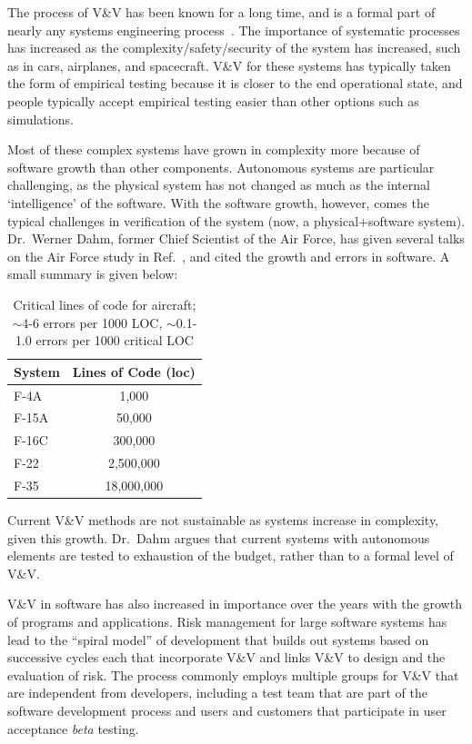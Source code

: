 The process of V\&V has been known for a long time, and is a formal part of nearly any systems engineering process~\cite{Blanchard2010}. The importance  of systematic processes has increased as the complexity/safety/security of the system has increased, such as in cars, airplanes, and spacecraft. V\&V for these systems has typically taken the form of empirical testing because it is closer to the end operational state, and people typically accept empirical testing easier than other options such as simulations. 

Most of these complex systems have grown in complexity more because of software growth than other components. Autonomous systems are particular challenging, as the physical system has not changed as much as the internal `intelligence' of the software. With the software growth, however, comes the typical challenges in verification of the system (now, a physical+software system). Dr.\ Werner Dahm, former Chief Scientist of the Air Force, has given several talks on the Air Force study in Ref.~\cite{tech-horizons2011}, and cited the growth and errors in software. A small summary is given below:

\begin{table}
\begin{center}
\begin{tabular}{l|c}
System &  Lines of Code (loc)\\ \hline
F-4A & 1,000\\
F-15A &  50,000\\
F-16C &  300,000\\
F-22 &  2,500,000\\
F-35 &  18,000,000
\end{tabular}
\caption{Critical lines of code for aircraft; $\sim$4-6 errors per 1000 LOC, $\sim$0.1-1.0 errors per 1000 critical LOC}
   \label{table:loc}
\end{center}
\end{table}

Current V\&V methods are not sustainable as systems increase in complexity, given this growth. Dr.\ Dahm argues that current systems with autonomous elements are tested to exhaustion of the budget, rather than to a formal level of V\&V. 

V\&V in software has also increased in importance over the years with the growth of programs and applications.  Risk management for large software systems has
lead to the ``spiral model'' of development \cite{boehm1988spiral} that builds out systems based on successive cycles each that incorporate V\&V and links V\&V to 
design and the evaluation of risk.  The process commonly employs multiple groups for V\&V that are independent from developers, including a test team that are 
part of the software development process and users and customers that participate in user acceptance {\em beta} testing.  

